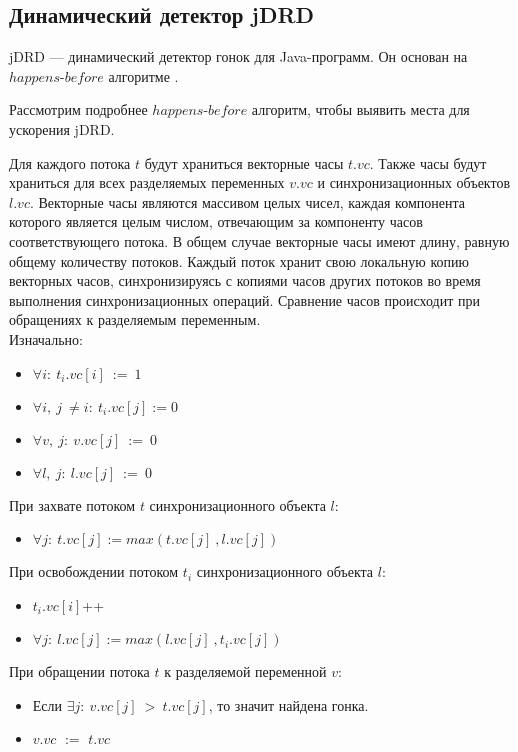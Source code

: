 \subsection{Динамический детектор jDRD}
jDRD --- динамический детектор гонок для Java-программ. Он основан на $happens$-$before$ алгоритме \cite{DRD}. 

Рассмотрим подробнее $happens$-$before$ алгоритм, чтобы выявить места для ускорения jDRD.

Для каждого потока $t$ будут храниться векторные часы $t.vc$. Также часы будут храниться для всех разделяемых переменных $v.vc$ и синхронизационных объектов $l.vc$.
Векторные часы являются массивом целых чисел, каждая компонента которого является целым числом, отвечающим за компоненту часов соответствующего потока. В общем случае векторные часы имеют длину, равную общему количеству потоков. Каждый поток хранит свою локальную копию векторных часов, синхронизируясь с копиями часов других потоков во время выполнения синхронизационных операций.
Сравнение часов происходит при обращениях к разделяемым переменным.
\\Изначально:  

\begin{itemize}
	\item $ \forall i:\ t_i.vc[i]\ :=\ 1$
	\item $ \forall i,\ j\ \neq i:\ t_i.vc[j] := 0$
	\item $ \forall v,\ j:\  v.vc[j]\ :=\ 0$
	\item $ \forall l,\ j:\  l.vc[j]\ :=\ 0$
\end{itemize}
При захвате потоком $t$ синхронизационного объекта $l$: 

\begin{itemize}
	\item $ \forall j:\ t.vc[j] := max(t.vc[j]\ , l.vc[j])$
\end{itemize}
При освобождении потоком $t_i$ синхронизационного объекта $l$: 

\begin{itemize}
	\item $t_i.vc[i]$++
	\item $ \forall j:\ l.vc[j] := max(l.vc[j]\ , t_i.vc[j])$
\end{itemize}
При обращении потока $t$ к разделяемой переменной $v$: 
\begin{itemize}
	\item Если $ \exists j:\ v.vc[j]\ >\ t.vc[j]$, то значит найдена гонка. 
	\item $v.vc$ $:=$ $t.vc$
\end{itemize}


